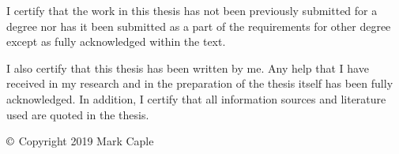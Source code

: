 \thispagestyle{empty}
\begin{certificate}


I certify that the work in this thesis has not been previously submitted for a degree nor has it been submitted as a part of the requirements for other degree except as fully acknowledged within the text.

\vspace{6pt}

\noindent I also certify that this thesis has been written by me. Any help that I have received in my research and in the preparation of the thesis
itself has been fully acknowledged. In addition, I certify that all information sources and literature used are quoted in the thesis.

\vspace{6pt}

\hfill $\copyright$ Copyright 2019 Mark Caple


\end{certificate}
